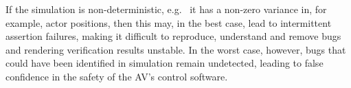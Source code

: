 \documentclass[letterpaper, 10 pt, journal, twoside]{IEEEtran}
\begin{document}
%
%

If the simulation is non-deterministic, e.g.\ 
it has a non-zero variance in, for example, actor positions, then this may, in the best case, lead to intermittent assertion failures, making it difficult to reproduce, understand and remove bugs and rendering verification results unstable. In the worst case, however, bugs that could have been identified in simulation remain undetected, leading to false confidence in the safety of the AV's control software. 
%

\end{document}

